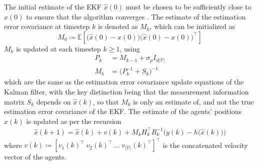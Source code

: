 \documentclass[twocolumn]{article}
\theoremstyle{plain}
\theoremstyle{definition}
\theoremstyle{definition}
\theoremstyle{remark}
\begin{document}
The initial estimate of the EKF $\hat x(0)$ must be chosen to be sufficiently close to $x(0)$ to ensure that the algorithm converges \cite{ekf1999}. 
The estimate of the estimation error covariance at timestep $k$ is denoted as $M_k$, which can be initialized as
\[
M_0\coloneqq \mathbb E \left[\Big(\hat x(0)-x(0)\Big)\Big(\hat x(0)-x(0)\Big)^\top \right]\]
$M_k$ is updated at each timestep $k\geq 1$, using
\begin{align}
P_{k} &= M_{k-1} + \sigma_p I_{d|\mathcal V|}
\label{eq:P_update}\\
M_{k} &= \big(P_{k}^{-1} + S_{k}\big)^{-1}
\label{eq:M_update}
\end{align}
which are the same as the estimation error covariance update equations of the Kalman filter, with the key distinction being that the measurement information matrix $S_k$ depends on $\hat x(k)$, so that $M_k$ is only an estimate of, and not the true estimation error covariance of the EKF.
The estimate of the agents' positions $\hat x(k)$ is updated as per the recursion
\begin{align}
    \hat x(k+1) = \hat x(k) + v(k) + M_k H_k^\top R_k^{-1} \Big(y(k) - h\big(\hat x(k)\big)\Big)
    \label{eq:x_update}
\end{align}
where $v(k) \coloneqq [v_1(k)^\top\ v_2(k)^\top\ \dots\ v_{|\mathcal V|}(k)^\top]^\top$ is the concatenated velocity vector of the agents.
\end{document}
